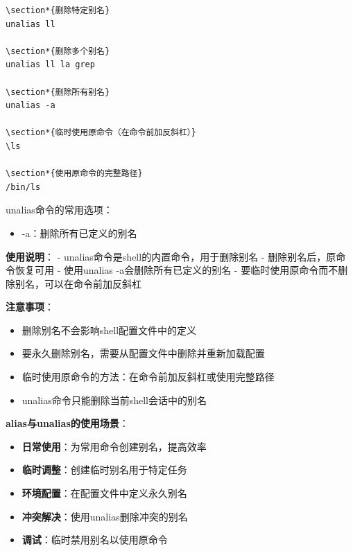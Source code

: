 \documentclass[12pt,UTF8]{ctexbook}
\begin{document}
\begin{verbatim}
\section*{删除特定别名}
unalias ll

\section*{删除多个别名}
unalias ll la grep

\section*{删除所有别名}
unalias -a

\section*{临时使用原命令（在命令前加反斜杠）}
\ls

\section*{使用原命令的完整路径}
/bin/ls
\end{verbatim}

unalias命令的常用选项：
\begin{itemize}
    \item -a：删除所有已定义的别名
\end{itemize}

\textbf{使用说明}：
- unalias命令是shell的内置命令，用于删除别名
- 删除别名后，原命令恢复可用
- 使用unalias -a会删除所有已定义的别名
- 要临时使用原命令而不删除别名，可以在命令前加反斜杠

\textbf{注意事项}：
\begin{itemize}
    \item 删除别名不会影响shell配置文件中的定义
    \item 要永久删除别名，需要从配置文件中删除并重新加载配置
    \item 临时使用原命令的方法：在命令前加反斜杠或使用完整路径
    \item unalias命令只能删除当前shell会话中的别名
\end{itemize}

\textbf{alias与unalias的使用场景}：
\begin{itemize}
    \item \textbf{日常使用}：为常用命令创建别名，提高效率
    \item \textbf{临时调整}：创建临时别名用于特定任务
    \item \textbf{环境配置}：在配置文件中定义永久别名
    \item \textbf{冲突解决}：使用unalias删除冲突的别名
    \item \textbf{调试}：临时禁用别名以使用原命令
\end{itemize}
\end{document}
